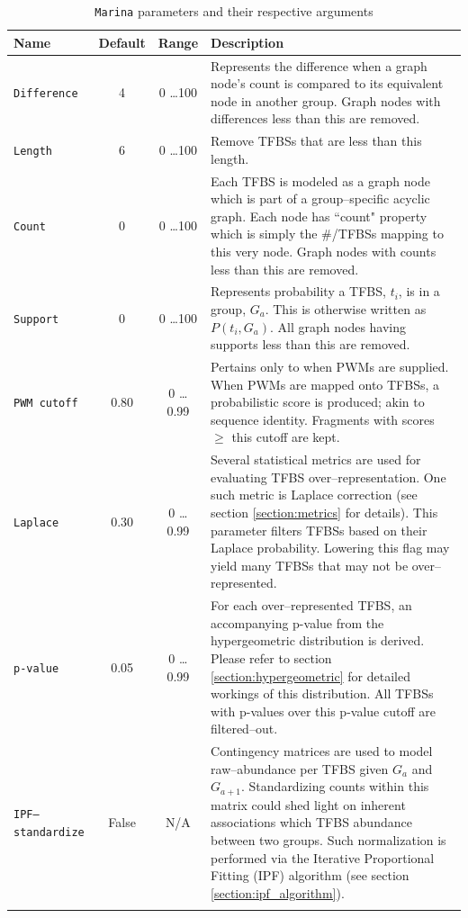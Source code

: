 \documentclass{article}
\begin{document}
\begin{longtable}{| p{2.7cm} | c | c | p{8.5cm} |}
	\hline
	Name  & Default & Range & Description \\ \hline \hline
	\texttt{Difference}  & 4 & 0 \ldots 100 & Represents the
	difference when a graph node's count is compared to its equivalent node in another group.
	Graph nodes with differences less than this are removed.\\
	
	\texttt{Length}  & 6 & 0 \ldots 100 &
	Remove TFBSs that are less than this length.\\

	\texttt{Count}  & 0 & 0 \ldots 100 & Each TFBS is modeled as a graph node
	which is part of a group--specific acyclic graph. Each node has ``count" property
	which is simply the \#/TFBSs mapping to this very node.
	Graph nodes with counts less than this are removed.\\

	\texttt{Support}  & 0 & 0 \ldots 100 & Represents probability a TFBS, $t_i$,
	is in a group, $G_a$. This is otherwise written as $P(t_i, G_a)$.
	All graph nodes having supports less than this are removed. \\

	\texttt{PWM cutoff}  & 0.80 & 0 \ldots 0.99 & Pertains only to when PWMs are supplied.
	When PWMs are mapped onto TFBSs, a probabilistic score is produced; akin to sequence identity.
	Fragments with scores $\geq$ this cutoff are kept.\\

	\texttt{Laplace} & 0.30 & 0 \ldots 0.99 & Several statistical metrics are used for
	evaluating TFBS over--representation. One such metric is Laplace correction (see section
	\ref{section:metrics} for details). This parameter filters
	TFBSs based on their Laplace probability. Lowering this flag may yield many
	TFBSs that may not be over--represented. \\

	\texttt{p-value} & 0.05 & 0 \ldots 0.99 &
	For each over--represented TFBS, an accompanying p-value from the hypergeometric distribution
	is derived. Please refer to section \ref{section:hypergeometric} for detailed workings of this
	distribution. All TFBSs with p-values over this p-value cutoff are 
	filtered--out. \\

	\texttt{IPF--standardize} & False & N/A & Contingency matrices are used to model
	raw--abundance per TFBS given $G_{a}$ and $G_{a+1}$. Standardizing counts within this
	matrix could shed light
	on inherent associations which TFBS abundance between two groups. Such normalization is
	performed via the Iterative Proportional Fitting (IPF) algorithm 
	(see section \ref{section:ipf_algorithm}). \\
	\hline
	\caption{\texttt{Marina} parameters and their respective arguments}
	\label{table:params}
\end{longtable}
\clearpage
\end{document}

